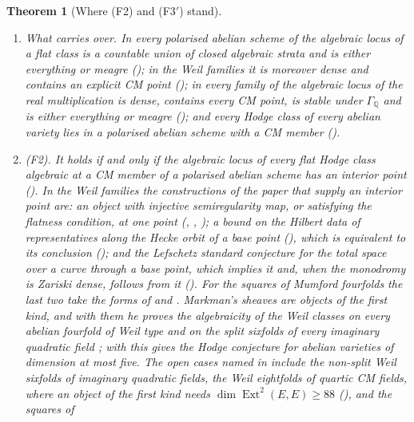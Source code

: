 \documentclass[11pt,reqno]{amsart}
\theoremstyle{plain}
\newtheorem{theorem}{Theorem}[section]
\theoremstyle{definition}
\theoremstyle{remark}
\newcommand{\QQ}{\mathbb{Q}}
\DeclareMathOperator{\Ext}{Ext}
\begin{document}
\begin{theorem}[Where (F2) and (F3$'$) stand]\label{thm:twostand}
\leavevmode
\begin{enumerate}[label=\textup{(\roman*)},leftmargin=2.6em,itemsep=3pt]
\item \emph{What carries over.} In every polarised abelian scheme of
   the algebraic locus of a flat class is a
  countable union of closed algebraic strata and is either everything or
  meagre (); in the Weil families it is moreover dense
  and contains an explicit CM point (\cite[Theorem~1.1]{paperI}); in every family of
   the algebraic locus of the real multiplication is dense,
  contains every CM point, is stable under $\Gamma_{\QQ}$ and is either
  everything or meagre (); and every Hodge class of every
  abelian variety lies in a polarised abelian scheme with a CM member
  ().
\item \emph{(F2).} It holds if and only if the algebraic locus of every flat
  Hodge class algebraic at a CM member of a polarised abelian scheme has an
  interior point (). In the Weil families the
  constructions of the paper that supply an interior point are: an object
  with injective semiregularity map, or satisfying the flatness condition,
  at one point (\cite[Theorem~2.3]{paperII}, \cite[Theorem~17.7]{paperI},
  \cite[Proposition~3.15]{paperII}); a bound on the Hilbert data of representatives along
  the Hecke orbit of a base point (\cite[Theorem~16.9]{paperI}), which is
  equivalent to its conclusion (\cite[Theorem~16.17]{paperI}); and the Lefschetz
  standard conjecture for the total space over a curve through a base point,
  which implies it and, when the monodromy is Zariski dense, follows from it
  (). For the squares of Mumford fourfolds the last two
  take the forms of  and .
  Markman's sheaves are objects of the first kind, and with them he proves
  the algebraicity of the Weil classes on every abelian fourfold of Weil
  type and on the split sixfolds of every imaginary quadratic field
  \cite{Mar25a,Mar25b}; with \cite{MZ99} this gives the Hodge conjecture for
  abelian varieties of dimension at most five. The open cases named in
   include the non-split Weil sixfolds of imaginary
  quadratic fields, the Weil eightfolds of quartic CM fields, where an
  object of the first kind needs
  $\dim\Ext^{2}(E,E)\ge88$ (\cite[Corollary~5.15]{paperII}), and the squares of

\end{enumerate}
\end{theorem}
\end{document}
